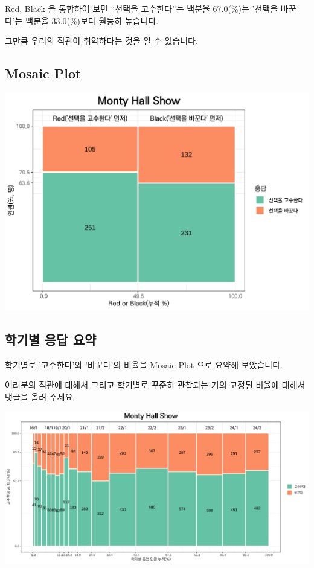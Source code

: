 \documentclass[
]{book}
\begin{document}
Red, Black 을 통합하여 보면 ``선택을 고수한다''는 백분율 67.0(\%)는 '선택을 바꾼다'는 백분율 33.0(\%)보다 월등히 높습니다.

그만큼 우리의 직관이 취약하다는 것을 알 수 있습니다.

\subsection{Mosaic Plot}\label{mosaic-plot-29}

\includegraphics{Quiz_report_2025_files/figure-latex/unnamed-chunk-409-1.pdf}

\subsection{학기별 응답 요약}\label{uxd559uxae30uxbcc4-uxc751uxb2f5-uxc694uxc57d-1}

학기별로 '고수한다'와 '바꾼다'의 비율을 Mosaic Plot 으로 요약해 보았습니다.

여러분의 직관에 대해서 그리고 학기별로 꾸준히 관찰되는 거의 고정된 비율에 대해서 댓글을 올려 주세요.

\includegraphics{Quiz_report_2025_files/figure-latex/Monty Hall History-1.pdf}
\end{document}

